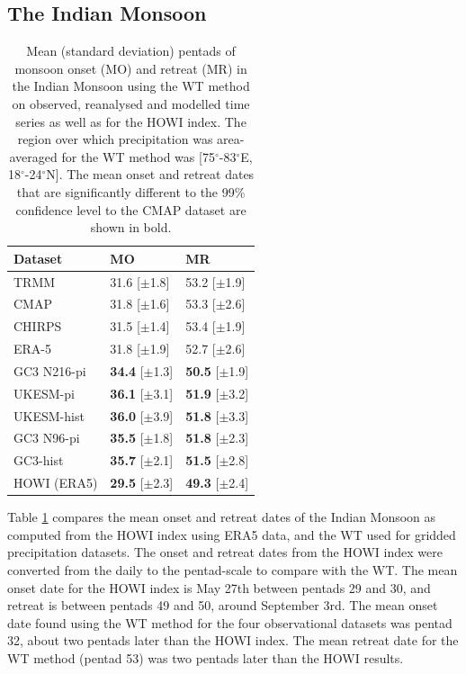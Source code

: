 \subsection{The Indian Monsoon}
\begin{table}[t!]
\caption{Mean (standard deviation) pentads of monsoon onset (MO) and retreat (MR) in the Indian Monsoon using the WT method on observed, reanalysed and modelled time series as well as for the HOWI index. The region over which precipitation was area-averaged for the WT method was [75$^\circ$-83$^\circ$E, 18$^\circ$-24$^\circ$N]. The mean onset and retreat dates that are significantly different to the 99\% confidence level to the CMAP dataset are shown in bold.  }
\label{tab:3a}       %
\begin{tabular}{p{4cm}p{3.5cm}p{3.5cm}}
\hline\centering{\smallskip}
Dataset & MO 	& MR 	\\ \hline
TRMM & 31.6 [$\pm$1.8] & 53.2 [$\pm$1.9]   \\
CMAP & 31.8 [$\pm$1.6] & 53.3 [$\pm$2.6]   \\
CHIRPS & 31.5 [$\pm$1.4] & 53.4 [$\pm$1.9]    \\
ERA-5 & 31.8 [$\pm$1.9] & 52.7 [$\pm$2.6]    \\
GC3 N216-pi  & {\bf34.4} [$\pm$1.3] & {\bf 50.5} [$\pm$1.9] \\
UKESM-pi & {\bf36.1} [$\pm$3.1] & {\bf 51.9} [$\pm$3.2]   \\
UKESM-hist & {\bf36.0} [$\pm$3.9] & {\bf51.8} [$\pm$3.3]   \\
GC3 N96-pi & {\bf35.5} [$\pm$1.8] & {\bf51.8} [$\pm$2.3]  \\
GC3-hist & {\bf35.7} [$\pm$2.1] & {\bf51.5} [$\pm$2.8]  \\
HOWI (ERA5) & {\bf29.5} [$\pm$2.3] & {\bf49.3} [$\pm$2.4]
\end{tabular}
\end{table}

Table \ref{tab:3a} compares the mean onset and retreat dates of the Indian Monsoon as computed from the HOWI index using ERA5 data, and the WT used for gridded precipitation datasets.
The onset and retreat dates from the HOWI index were converted from the daily to the pentad-scale to compare with the WT. The mean onset date for the HOWI index is May 27th between pentads 29 and 30, and retreat is between pentads 49 and 50, around September 3rd. The mean onset date found using the WT method for the four observational datasets was pentad 32, about two pentads later than the HOWI index. The mean retreat date for the WT method (pentad 53) was two pentads later than the HOWI results.

